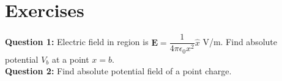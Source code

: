 \documentclass[12pt,a4paper]{article}
\begin{document}
\section{Exercises}
\noindent\textbf{Question 1:} Electric field in region is $\textbf{E}=\dfrac{1}{4\pi\epsilon_0x^2}\hat x$ V/m. Find absolute potential $V_b$ at a point $x=b$.\\[0.2cm]
\noindent\textbf{Question 2:} Find absolute potential field of a point charge.
%
%
\end{document}
